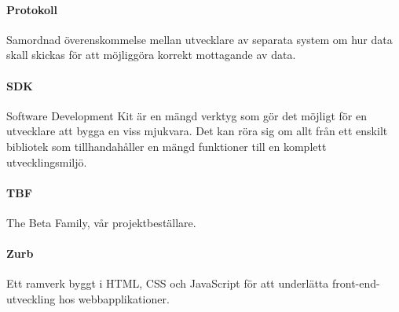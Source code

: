 \paragraph{Protokoll} Samordnad överenskommelse mellan utvecklare av separata system om hur data skall skickas för att möjliggöra korrekt mottagande av data.

\paragraph{SDK} Software Development Kit är en mängd verktyg som gör det möjligt för en utvecklare att bygga en viss mjukvara. Det kan röra sig om allt från ett enskilt bibliotek som tillhandahåller en mängd funktioner till en komplett utvecklingsmiljö.

\paragraph{TBF} The Beta Family, vår projektbeställare.

\paragraph{Zurb} Ett ramverk byggt i HTML, CSS och JavaScript för att underlätta front-end-utveckling hos webbapplikationer\parencite{zurb}.